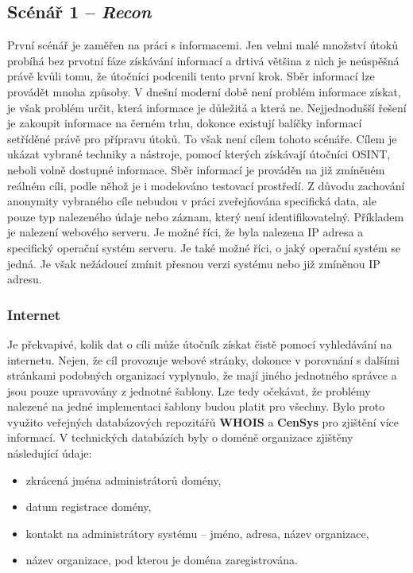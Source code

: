 

\subsection{Scénář 1 -- \textit{Recon}}\label{subsec:scenar-1}
První scénář je zaměřen na práci s informacemi.
Jen velmi malé množství útoků probíhá bez prvotní fáze získávání informací a drtivá většina z nich je neúspěšná právě kvůli tomu, že útočníci podcenili tento první krok.
Sběr informací lze provádět mnoha způsoby.
V dnešní moderní době není problém informace získat, je však problém určit, která informace je důležitá a která ne.
Nejjednodušší řešení je zakoupit informace na černém trhu, dokonce existují balíčky informací setříděné právě pro přípravu útoků.
To však není cílem tohoto scénáře.
Cílem je ukázat vybrané techniky a nástroje, pomocí kterých získávají útočníci \ac{OSINT}, neboli volně dostupné informace.
Sběr informací je prováděn na již zmíněném reálném cíli, podle něhož je i modelováno testovací prostředí.
Z důvodu zachování anonymity vybraného cíle nebudou v práci zveřejňována specifická data, ale pouze typ nalezeného údaje nebo záznam, který není identifikovatelný.
Příkladem je nalezení webového serveru.
Je možné říci, že byla nalezena IP adresa a specifický operační systém serveru.
Je také možné říci, o jaký operační systém se jedná.
Je však nežádoucí zmínit přesnou verzi systému nebo již zmíněnou IP adresu.


\subsubsection{Internet}
Je překvapivé, kolik dat o cíli může útočník získat čistě pomocí vyhledávání na internetu.
Nejen, že cíl provozuje webové stránky, dokonce v porovnání s dalšími stránkami podobných organizací vyplynulo, že mají jiného jednotného správce a jsou pouze upravovány z jednotné šablony.
Lze tedy očekávat, že problémy nalezené na jedné implementaci šablony budou platit pro všechny.
Bylo proto využito veřejných databázových repozitářů \textbf{WHOIS} a \textbf{CenSys} pro zjištění více informací.
V technických databázích byly o doméně organizace zjištěny následující údaje:
\begin{itemize}
	\item zkrácená jména administrátorů domény,
	\item datum registrace domény,
	\item kontakt na administrátory systému – jméno, adresa, název organizace,
	\item název organizace, pod kterou je doména zaregistrována.
\end{itemize}

